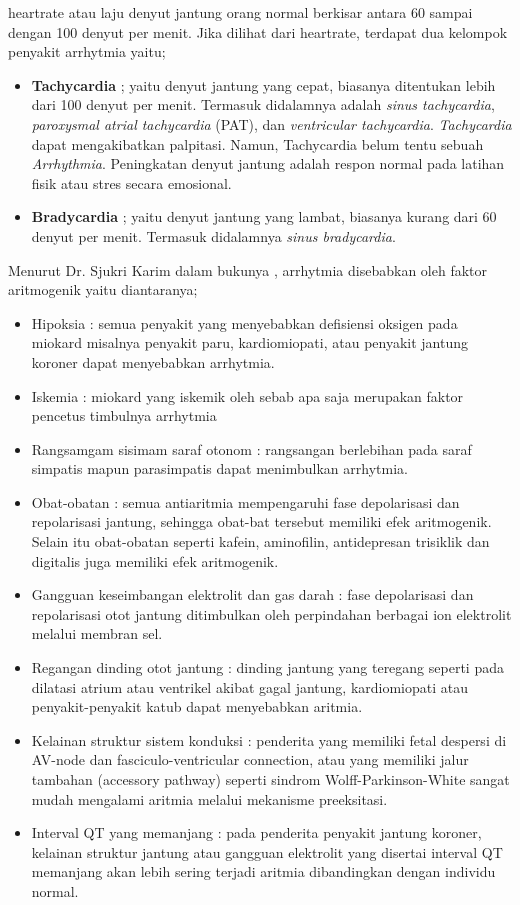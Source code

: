 \Gls{heartrate} atau laju denyut jantung orang normal berkisar
antara 60 sampai dengan 100 denyut per menit\cite{medicinenet.2}. Jika dilihat
dari \gls{heartrate}, terdapat dua kelompok penyakit \gls{arrhytmia} yaitu;
\begin{itemize}
	\item \textbf{Tachycardia} ; yaitu denyut jantung yang cepat, biasanya
	ditentukan lebih dari 100 denyut per menit. Termasuk didalamnya adalah 
	\textit{sinus tachycardia}, \textit{paroxysmal atrial tachycardia} (PAT), dan
	\textit{ventricular tachycardia}. \textit{Tachycardia}  dapat mengakibatkan
	\gls{palpitasi}. Namun, Tachycardia belum tentu sebuah 	\textit{Arrhythmia}.
	Peningkatan denyut jantung adalah respon  normal pada latihan fisik atau stres
	secara emosional.

	\item \textbf{Bradycardia} ; yaitu denyut jantung yang lambat, biasanya kurang
	dari 60 denyut per menit. Termasuk didalamnya \textit{sinus bradycardia}.
\end{itemize}
 
Menurut Dr. Sjukri Karim dalam bukunya \cite{karim.1}, \gls{arrhytmia}
disebabkan oleh faktor aritmogenik yaitu diantaranya;
\begin{itemize}
  \item Hipoksia : semua penyakit yang menyebabkan defisiensi oksigen pada
  miokard misalnya penyakit paru, kardiomiopati, atau penyakit jantung koroner
  dapat menyebabkan \gls{arrhytmia}.
  \item Iskemia : miokard yang iskemik oleh sebab apa saja merupakan faktor
  pencetus timbulnya \gls{arrhytmia}
  \item Rangsamgam sisimam saraf otonom : rangsangan berlebihan pada saraf
  simpatis mapun parasimpatis dapat menimbulkan \gls{arrhytmia}.
  \item Obat-obatan : semua antiaritmia mempengaruhi fase depolarisasi dan
  repolarisasi jantung, sehingga obat-bat tersebut memiliki efek aritmogenik.
  Selain itu obat-obatan seperti kafein, aminofilin, antidepresan trisiklik dan
  digitalis juga memiliki efek aritmogenik.
  \item Gangguan keseimbangan elektrolit dan gas darah : fase depolarisasi dan
  repolarisasi otot jantung ditimbulkan oleh perpindahan berbagai ion elektrolit
  melalui membran sel.
  \item Regangan dinding otot jantung : dinding jantung yang teregang seperti
  pada dilatasi atrium atau ventrikel akibat gagal jantung, kardiomiopati atau
  penyakit-penyakit katub dapat menyebabkan aritmia.
  \item Kelainan struktur sistem konduksi : penderita yang memiliki fetal
  despersi di AV-node dan fasciculo-ventricular connection, atau yang memiliki
  jalur tambahan (accessory pathway) seperti sindrom Wolff-Parkinson-White
  sangat mudah mengalami aritmia melalui mekanisme preeksitasi.
  \item Interval QT yang memanjang : pada penderita penyakit jantung koroner,
  kelainan struktur jantung atau gangguan elektrolit yang disertai interval QT
  memanjang akan lebih sering terjadi aritmia dibandingkan dengan individu
  normal.
\end{itemize} 

